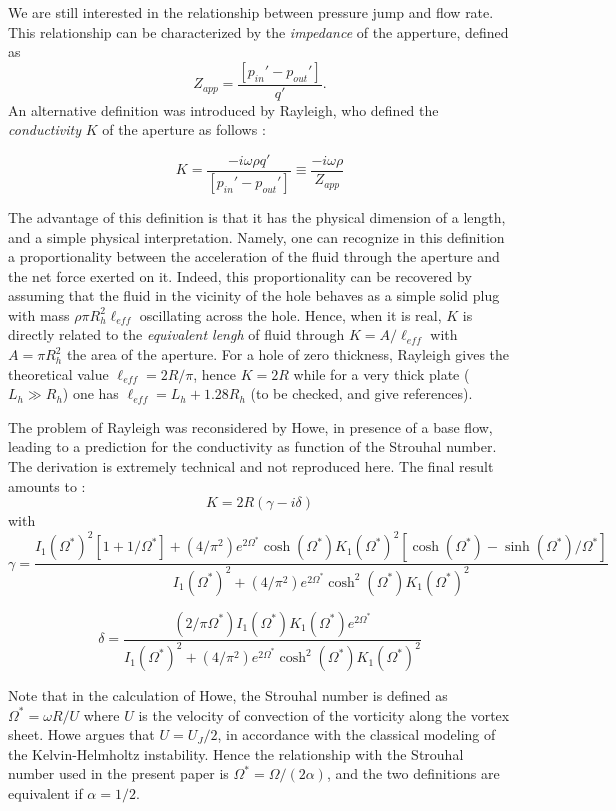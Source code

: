\documentclass{jfm}
\newcommand\be{\begin{equation}}
\newcommand\ee{\end{equation}}
\begin{document}
We are still interested in the relationship between pressure jump and flow rate. This relationship can be characterized by the {\em impedance} of the apperture, defined as 
$$
Z_{app} = \frac{[p_{in}'-  p_{out}']}{q'}.
$$
An alternative definition was introduced by Rayleigh, who defined the {\em conductivity} $K$ of the aperture as follows :

$$
K = \frac{-i \omega \rho q'}{[p_{in}'-  p_{out}']} \equiv \frac{- i \omega \rho}{Z_{app}}  
$$

The advantage of this definition is that it has the physical dimension of a length, and a simple physical interpretation. Namely, one can recognize in this definition a proportionality between the acceleration of the fluid through the aperture and the net force exerted on it. Indeed, this proportionality can be recovered by assuming that the fluid in the vicinity of the hole behaves as a simple solid plug with mass $\rho \pi R_h^2 \ell_{eff}$ oscillating across the hole. Hence, when it is real, $K$ is directly related to the {\em equivalent lengh} of fluid
through $K = A/\ell_{eff}$ with $A = \pi R_h^2$ the area of the aperture. 
For a hole of zero thickness, Rayleigh gives the theoretical value $\ell_{eff} = 2 R/ \pi$, hence $K = 2R$
while for a very thick plate ($L_h\gg R_h$) one has $\ell_{eff} = L_h + 1.28 R_h$  (to be checked, and give references). 


The problem of Rayleigh was reconsidered by Howe, in presence of a base flow, leading to a prediction for the conductivity as function of the Strouhal number. The derivation is extremely technical and not reproduced here. The final result amounts to :
$$
K = 2R ( \gamma - i \delta)
$$
with
\be
\gamma = \frac{
I_1(\Omega^*)^2[1+1/\Omega^*]+(4/\pi^2) e^{2\Omega^*}\cosh(\Omega^*) K_1(\Omega^*)^2[\cosh(\Omega^*)-\sinh(\Omega^*)/\Omega^*]
}
{
I_1(\Omega^*)^2+(4/\pi^2) e^{2\Omega^*}\cosh^2(\Omega^*) K_1(\Omega^*)^2
}
\label{eq:gammaHowe}
\ee

\be
\delta = 
\frac{
(2/\pi \Omega^*) I_1(\Omega^*) K_1(\Omega^*)e^{2\Omega^*}
}
{
I_1(\Omega^*)^2+(4/\pi^2) e^{2\Omega^*}\cosh^2(\Omega^*) K_1(\Omega^*)^2
}
\label{eq:deltaHowe}
\ee

Note that in the calculation of Howe, the Strouhal number is defined as $\Omega^* = \omega R/U$ where $U$ is the velocity of convection of the vorticity along the vortex sheet. Howe argues that $U= U_J/2$, in accordance with the classical modeling of the Kelvin-Helmholtz instability.
Hence the relationship with the Strouhal number used in the present paper is $\Omega^* = \Omega/(2 \alpha)$, and the two definitions are equivalent if $\alpha = 1/2$.
\end{document}
